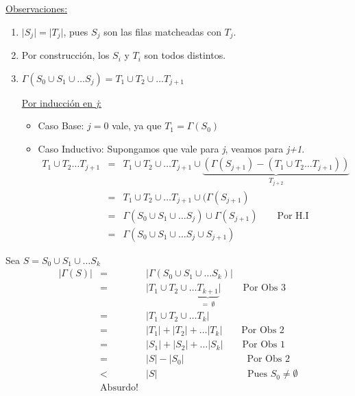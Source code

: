 \documentclass[12pt,a4paper]{report}
\newcounter{neq}
\begin{document}
			\vspace{5mm}
			\underline{Observaciones:}
			\begin{enumerate}
				\item $\lvert S_{j} \rvert = \lvert T_{j} \rvert$, pues $S_{j}$ son las filas matcheadas con $T_{j}$.
				\item Por construcción, los $S_{i}$ y $T_{i}$ son todos distintos.
				\item $\Gamma(S_{0} \cup S_{1} \cup \dotsc S_{j}) = T_{1} \cup T_{2} \cup \dotsc T_{j+1}$
					\par \underline{Por inducción en \textit{j}:}
						\begin{itemize}
							\item Caso Base: $j = 0$ vale, ya que $T_{1} = \Gamma(S_{0})$
							\item Caso Inductivo: Supongamos que vale para \textit{j}, veamos para \textit{j+1}.
								\begin{eqnarray}
									\nonumber T_{1} \cup T_{2} \dotsc T_{j + 1} &=& T_{1} \cup T_{2} \cup \dotsc T_{j + 1} \cup \underbrace{(\Gamma(S_{j + 1}) - (T_{1} \cup T_{2} \dotsc T_{j + 1}))}_{T_{j + 2}} \\
									\nonumber &=& T_{1} \cup T_{2} \cup \dotsc T_{j + 1} \cup (\Gamma(S_{j + 1}) \\
									\nonumber &=& \Gamma(S_{0} \cup S_{1} \cup \dotsc S_{j}) \cup \Gamma(S_{j + 1}) \qquad \text{Por H.I} \\
									\nonumber &=& \Gamma(S_{0} \cup S_{1} \cup \dotsc S_{j} \cup S_{j + 1})
								\end{eqnarray}
						\end{itemize}
			\end{enumerate}

			\par Sea $S = S_{0} \cup S_{1} \cup \dotsc S_{k}$
				\begin{eqnarray}
					\nonumber \lvert \Gamma(S) \rvert &=& \lvert \Gamma(S_{0} \cup S_{1} \cup \dotsc S_{k}) \rvert \\
					\nonumber &=& \lvert T_{1} \cup T_{2} \cup \dotsc \underbrace{T_{k+1}}_{= \; \emptyset} \rvert \qquad \; \text{Por Obs 3} \\
					\nonumber &=& \lvert T_{1} \cup T_{2} \cup \dotsc T_{k} \rvert \\
					\nonumber &=& \lvert T_{1} \rvert + \lvert T_{2} \rvert + \dotsc \lvert T_{k} \rvert \qquad \text{Por Obs 2} \\
					\nonumber &=& \lvert S_{1} \rvert + \lvert S_{2} \rvert + \dotsc \lvert S_{k} \rvert \qquad \text{Por Obs 1} \\
					\nonumber &=& \lvert S \rvert - \lvert S_{0} \rvert \qquad \qquad \qquad \; \; \text{Por Obs 2} \\
					\nonumber &<& \lvert S \rvert \qquad \qquad \qquad \qquad \; \; \; \; \;\text{Pues } S_{0} \neq \emptyset \\
					\nonumber & \text{Absurdo!} &
				\end{eqnarray}
\end{document}

